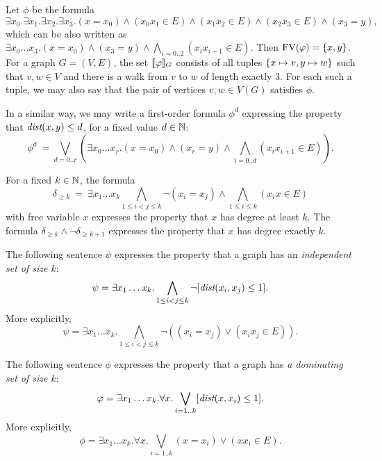 \begin{example}\label{ex:walk}
	Let $\phi$ be the formula $$\exists x_0.\exists x_1.\exists x_2.\exists x_3.(x=x_0)\land (x_0x_1\in E)\land (x_1x_2\in E)\land (x_2x_3\in E)\land (x_3=y),$$
	which can be also written as $\exists x_0\ldots x_3. (x=x_0)\land (x_3=y)\land\bigwedge_{i=0..2} (x_ix_{i+1}\in E)$. Then $\textrm{FV}(\varphi)=\{x,y\}$.
	For a graph $G=(V,E)$, the set $[\![\varphi]\!]_G$ consists of all tuples
	$\{x\mapsto v,y\mapsto w\}$ such that $v,w\in V$ and there is a walk from $v$ to $w$
	of length exactly $3$. For each such a tuple, we may also say that the pair of vertices $v,w\in V(G)$ satisfies $\phi$.
\end{example}
	
\begin{example}\label{ex:dist}
	In a similar way, we may write a first-order formula 
	$\phi^d$ expressing the property that $\textit{dist}(x,y)\le d$, for a fixed value $d\in\mathbb{N}$:
	$$\phi^d\ =\bigvee_{d=0..r}\left(\exists x_0\ldots x_r. (x=x_0)\land (x_r=y)\land\bigwedge_{i=0..d} (x_ix_{i+1}\in E)\right).$$ 
\end{example}	

\begin{example}\label{ex:deg}
	For a fixed $k\in\mathbb{N}$, the  formula $$\delta_{\ge k}\ =\ \exists x_1\ldots x_k \bigwedge_{1\le i<j\le k} \neg(x_i=x_j)\land \bigwedge_{1\le i\le k}
	(x_ix\in E)$$ with free variable $x$ expresses the property that $x$ has degree at least $k$.
	The formula $\delta_{\ge k}\land \neg\delta_{\ge {k+1}}$ expresses the property that $x$ has degree exactly $k$.
\end{example}



\begin{example}
  The following sentence $\psi$ expresses the property that
  a graph has an \emph{independent set of size $k$}:
  $$\psi=\exists x_1\ldots x_k.\bigwedge_{1\le i<j\le k}\neg[\textit{dist}(x_i,x_j)\le 1].$$
  More explicitly,
$$\psi=\exists x_1\ldots x_k.\bigwedge_{1\le i<j\le k}\neg((x_i=x_j)\lor (x_ix_j\in E)).$$

	The following sentence $\phi$ expresses the property that a graph has \emph{a dominating set of size $k$}:
  $$\varphi=\exists x_1\ldots x_k.\forall x.\bigvee_{i=1..k}[\textit{dist}(x,x_i)\le 1].$$
  More explicitly,
  $$\phi=\exists x_1\ldots x_k.\forall x.\bigvee_{i=1..k}
  (x=x_i)\lor (xx_i\in E).$$
\end{example}

